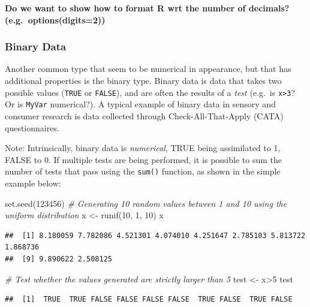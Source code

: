 \documentclass[
]{book}
\newenvironment{Shaded}{\begin{snugshade}}{\end{snugshade}}
\newcommand{\CommentTok}[1]{\textcolor[rgb]{0.56,0.35,0.01}{\textit{#1}}}
\newcommand{\DecValTok}[1]{\textcolor[rgb]{0.00,0.00,0.81}{#1}}
\newcommand{\FunctionTok}[1]{\textcolor[rgb]{0.00,0.00,0.00}{#1}}
\newcommand{\NormalTok}[1]{#1}
\newcommand{\OtherTok}[1]{\textcolor[rgb]{0.56,0.35,0.01}{#1}}
\newcommand{\SpecialCharTok}[1]{\textcolor[rgb]{0.00,0.00,0.00}{#1}}
\begin{document}
\textbf{Do we want to show how to format R wrt the number of decimals? (e.g.~options(digits=2))}

\hypertarget{binary-data}{%
\subsubsection{Binary Data}\label{binary-data}}

Another common type that seem to be numerical in appearance, but that has additional properties is the binary type.
Binary data is data that takes two possible values (\texttt{TRUE} or \texttt{FALSE}), and are often the results of a \emph{test} (e.g.~is \texttt{x\textgreater{}3}? Or is \texttt{MyVar} numerical?). A typical example of binary data in sensory and consumer research is data collected through Check-All-That-Apply (CATA) questionnaires.

Note: Intrinsically, binary data is \emph{numerical}, TRUE being assimilated to 1, FALSE to 0. If multiple tests are being performed, it is possible to sum the number of tests that pass using the \texttt{sum()} function, as shown in the simple example below:

\begin{Shaded}
\begin{Highlighting}[]
\FunctionTok{set.seed}\NormalTok{(}\DecValTok{123456}\NormalTok{)}
\CommentTok{\# Generating 10 random values between 1 and 10 using the uniform distribution}
\NormalTok{x }\OtherTok{\textless{}{-}} \FunctionTok{runif}\NormalTok{(}\DecValTok{10}\NormalTok{, }\DecValTok{1}\NormalTok{, }\DecValTok{10}\NormalTok{)}
\NormalTok{x}
\end{Highlighting}
\end{Shaded}

\begin{verbatim}
##  [1] 8.180059 7.782086 4.521301 4.074010 4.251647 2.785103 5.813722 1.868736
##  [9] 9.890622 2.508125
\end{verbatim}

\begin{Shaded}
\begin{Highlighting}[]
\CommentTok{\# Test whether the values generated are strictly larger than 5}
\NormalTok{test }\OtherTok{\textless{}{-}}\NormalTok{ x}\SpecialCharTok{\textgreater{}}\DecValTok{5}
\NormalTok{test}
\end{Highlighting}
\end{Shaded}

\begin{verbatim}
##  [1]  TRUE  TRUE FALSE FALSE FALSE FALSE  TRUE FALSE  TRUE FALSE
\end{verbatim}
\end{document}
